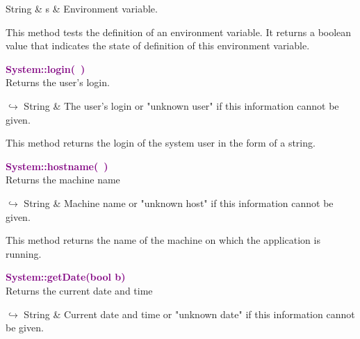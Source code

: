 \begin{tcolorbox}[width=\textwidth,myArgs,tabularx={ll|R}]
String & s & Environment variable.
\end{tcolorbox}

This method tests the definition of an environment variable. It returns a boolean value that indicates the state of definition of this environment variable.

\textcolor{purple}{\textbf{System::login(~)}}\label{System::login()}\\
Returns the user's login.\vspace*{-0.5em}
\begin{tcolorbox}[grow to left by=-1cm, width=\textwidth-1cm,myArgs,tabularx={l|R}]
$\hookrightarrow$ String & The user's login or "unknown user" if this information cannot be given.
\end{tcolorbox}

This method returns the login of the system user in the form of a string.

\textcolor{purple}{\textbf{System::hostname(~)}}\label{System::hostname()}\\
Returns the machine name\vspace*{-0.5em}
\begin{tcolorbox}[grow to left by=-1cm, width=\textwidth-1cm,myArgs,tabularx={l|R}]
$\hookrightarrow$ String & Machine name or "unknown host" if this information cannot be given.
\end{tcolorbox}

This method returns the name of the machine on which the application is running.

\textcolor{purple}{\textbf{System::getDate(bool b)}}\label{System::getDate(bool b)}\\
Returns the current date and time\vspace*{-0.5em}
\begin{tcolorbox}[grow to left by=-1cm, width=\textwidth-1cm,myArgs,tabularx={l|R}]
$\hookrightarrow$ String & Current date and time or "unknown date" if this information cannot be given.
\end{tcolorbox}

